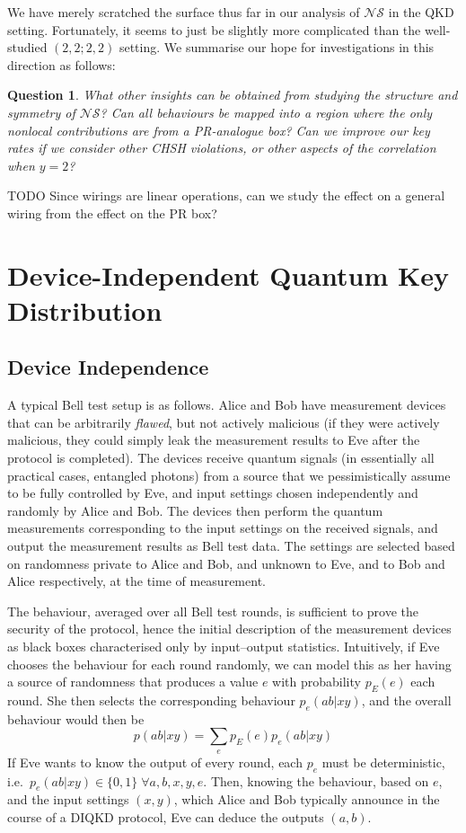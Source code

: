 \documentclass[10pt, a4paper]{article}
\numberwithin{equation}{section} %
\theoremstyle{definition}
\theoremstyle{plain}
\newtheorem{question}{Question}
\newcommand{\?}{\mathrel{?}} %
\newcommand{\NSs}{\mathcal{NS}}
\begin{document}
      We have merely scratched the surface thus far in our analysis of \(\NSs\) in the QKD setting. Fortunately, it seems to just be slightly more complicated than the well-studied \((2,2;2,2)\) setting. We summarise our hope for investigations in this direction as follows:
      \begin{question}
        What other insights can be obtained from studying the structure and symmetry of \(\NSs\)? Can all behaviours be mapped into a region where the only nonlocal contributions are from a PR-analogue box? Can we improve our key rates if we consider other CHSH violations, or other aspects of the correlation when \(y=2\)?
      \end{question}

      TODO Since wirings are linear operations, can we study the effect on a general wiring from the effect on the PR box?

    \section{Device-Independent Quantum Key Distribution}\label{sec:diqkd}

    \subsection{Device Independence}

    A typical Bell test setup is as follows. Alice and Bob have measurement devices that can be arbitrarily \emph{flawed}, but not actively malicious (if they were actively malicious, they could simply leak the measurement results to Eve after the protocol is completed). The devices receive quantum signals (in essentially all practical cases, entangled photons) from a source that we pessimistically assume to be fully controlled by Eve, and input settings chosen independently and randomly by Alice and Bob. The devices then perform the quantum measurements corresponding to the input settings on the received signals, and output the measurement results as Bell test data. The settings are selected based on randomness private to Alice and Bob, and unknown to Eve, and to Bob and Alice respectively, at the time of measurement.

    The behaviour, averaged over all Bell test rounds, is sufficient to prove the security of the protocol, hence the initial description of the measurement devices as black boxes characterised only by input--output statistics. Intuitively, if Eve chooses the behaviour for each round randomly, we can model this as her having a source of randomness that produces a value \(e\) with probability \(p_E(e)\) each round. She then selects the corresponding behaviour \(p_e(ab|xy)\), and the overall behaviour would then be
    \begin{equation}\label{eqn:finethm}
      p(ab|xy) = \sum_e p_E(e) p_e(ab|xy)
    \end{equation}
    If Eve wants to know the output of every round, each \(p_e\) must be deterministic, i.e.\ \(p_e(ab|xy) \in \{0, 1\}\;\forall a,b,x,y,e\). Then, knowing the behaviour, based on \(e\), and the input settings \((x,y)\), which Alice and Bob typically announce in the course of a DIQKD protocol, Eve can deduce the outputs \((a,b)\).
\end{document}
